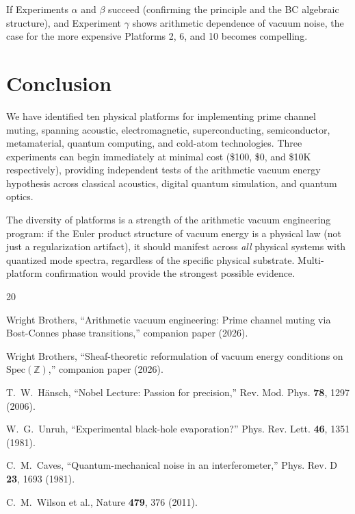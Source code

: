\documentclass[11pt,a4paper]{article}
\newcommand{\Spec}{\mathrm{Spec}}
\begin{document}
If Experiments $\alpha$ and $\beta$ succeed (confirming the
principle and the BC algebraic structure), and Experiment $\gamma$
shows arithmetic dependence of vacuum noise, the case for the
more expensive Platforms 2, 6, and 10 becomes compelling.

\section{Conclusion}
\label{sec:conclusion}

We have identified ten physical platforms for implementing
prime channel muting, spanning acoustic, electromagnetic,
superconducting, semiconductor, metamaterial, quantum computing,
and cold-atom technologies. Three experiments can begin
immediately at minimal cost (\$100, \$0, and \$10K respectively),
providing independent tests of the arithmetic vacuum energy
hypothesis across classical acoustics, digital quantum simulation,
and quantum optics.

The diversity of platforms is a strength of the arithmetic
vacuum engineering program: if the Euler product structure
of vacuum energy is a physical law (not just a regularization
artifact), it should manifest across \emph{all} physical systems
with quantized mode spectra, regardless of the specific
physical substrate. Multi-platform confirmation would provide
the strongest possible evidence.

\begin{thebibliography}{20}

Wright Brothers,
``Arithmetic vacuum engineering: Prime channel muting via
Bost-Connes phase transitions,''
companion paper (2026).

Wright Brothers,
``Sheaf-theoretic reformulation of vacuum energy conditions
on $\Spec(\mathbb{Z})$,''
companion paper (2026).

T.~W.~H\"ansch,
``Nobel Lecture: Passion for precision,''
Rev. Mod. Phys. \textbf{78}, 1297 (2006).

W.~G.~Unruh,
``Experimental black-hole evaporation?''
Phys. Rev. Lett. \textbf{46}, 1351 (1981).

C.~M.~Caves,
``Quantum-mechanical noise in an interferometer,''
Phys. Rev. D \textbf{23}, 1693 (1981).

C.~M.~Wilson et al.,
Nature \textbf{479}, 376 (2011).

\end{thebibliography}
\end{document}
